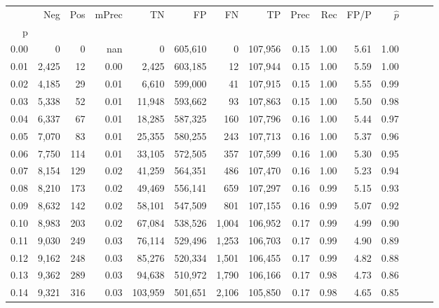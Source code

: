 \begin{tabular}{rrrrrrrrrrrrrrr}
\toprule
{} &    Neg &    Pos & mPrec &       TN &       FP &       FN &       TP &  Prec &   Rec &  FP/P & $\hat{p}$ \\
p    &        &        &       &          &          &          &          &       &       &       &           \\
\midrule
0.00 &      0 &      0 &   nan &        0 &  605,610 &        0 &  107,956 &  0.15 &  1.00 &  5.61 &      1.00 \\
0.01 &  2,425 &     12 &  0.00 &    2,425 &  603,185 &       12 &  107,944 &  0.15 &  1.00 &  5.59 &      1.00 \\
0.02 &  4,185 &     29 &  0.01 &    6,610 &  599,000 &       41 &  107,915 &  0.15 &  1.00 &  5.55 &      0.99 \\
0.03 &  5,338 &     52 &  0.01 &   11,948 &  593,662 &       93 &  107,863 &  0.15 &  1.00 &  5.50 &      0.98 \\
0.04 &  6,337 &     67 &  0.01 &   18,285 &  587,325 &      160 &  107,796 &  0.16 &  1.00 &  5.44 &      0.97 \\
0.05 &  7,070 &     83 &  0.01 &   25,355 &  580,255 &      243 &  107,713 &  0.16 &  1.00 &  5.37 &      0.96 \\
0.06 &  7,750 &    114 &  0.01 &   33,105 &  572,505 &      357 &  107,599 &  0.16 &  1.00 &  5.30 &      0.95 \\
0.07 &  8,154 &    129 &  0.02 &   41,259 &  564,351 &      486 &  107,470 &  0.16 &  1.00 &  5.23 &      0.94 \\
0.08 &  8,210 &    173 &  0.02 &   49,469 &  556,141 &      659 &  107,297 &  0.16 &  0.99 &  5.15 &      0.93 \\
0.09 &  8,632 &    142 &  0.02 &   58,101 &  547,509 &      801 &  107,155 &  0.16 &  0.99 &  5.07 &      0.92 \\
0.10 &  8,983 &    203 &  0.02 &   67,084 &  538,526 &    1,004 &  106,952 &  0.17 &  0.99 &  4.99 &      0.90 \\
0.11 &  9,030 &    249 &  0.03 &   76,114 &  529,496 &    1,253 &  106,703 &  0.17 &  0.99 &  4.90 &      0.89 \\
0.12 &  9,162 &    248 &  0.03 &   85,276 &  520,334 &    1,501 &  106,455 &  0.17 &  0.99 &  4.82 &      0.88 \\
0.13 &  9,362 &    289 &  0.03 &   94,638 &  510,972 &    1,790 &  106,166 &  0.17 &  0.98 &  4.73 &      0.86 \\
0.14 &  9,321 &    316 &  0.03 &  103,959 &  501,651 &    2,106 &  105,850 &  0.17 &  0.98 &  4.65 &      0.85 \\

\end{tabular}
